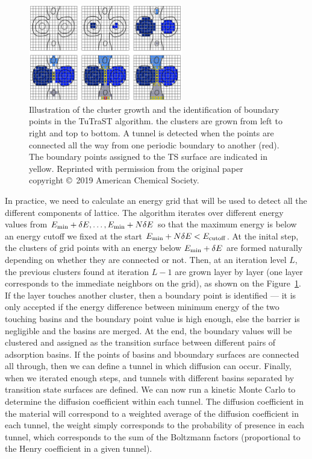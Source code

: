 \documentclass[main]{subfiles}
\begin{document}
\begin{figure}[ht]
  \centering
    \includegraphics[width=0.6\textwidth]{figures/5-diffusion/tutrast.jpg}
    \caption{ Illustration of the cluster growth and the identification of boundary points in the TuTraST algorithm\autocite{Mace_2019}. the clusters are grown from left to right and top to bottom. A tunnel is detected when the points are connected all the way from one periodic boundary to another (red). The boundary points assigned to the TS surface are indicated in yellow. Reprinted with permission from the original paper~\cite{Mace_2019} copyright \copyright\ 2019 American Chemical Society. }\label{fgr:tutrast}
\end{figure}

In practice, we need to calculate an energy grid that will be used to detect all the different components of lattice. The algorithm iterates over different energy values from $E_{\text{min}}+\delta E, \ldots, E_{\text{min}}+N\delta E$ so that the maximum energy is below an energy cutoff we fixed at the start $E_{\text{min}}+N\delta E<E_{\text{cutoff}}$. At the inital step, the clusters of grid points with an energy below $E_{\text{min}}+\delta E$ are formed naturally depending on whether they are connected or not. Then, at an iteration level $L$, the previous clusters found at iteration $L-1$ are grown layer by layer (one layer corresponds to the immediate neighbors on the grid), as shown on the Figure~\ref{fgr:tutrast}. If the layer touches another cluster, then a boundary point is identified --- it is only accepted if the energy difference between minimum energy of the two touching basins and the boundary point value is high enough, else the barrier is negligible and the basins are merged. At the end, the boundary values will be clustered and assigned as the transition surface between different pairs of adsorption basins. If the points of basins and bboundary surfaces are connected all through, then we can define a tunnel in which diffusion can occur. Finally, when we iterated enough steps, and tunnels with different basins separated by transition state surfaces are defined. We can now run a kinetic Monte Carlo to determine the diffusion coefficient within each tunnel. The diffusion coefficient in the material will correspond to a weighted average of the diffusion coefficient in each tunnel, the weight simply corresponds to the probability of presence in each tunnel, which corresponds to the sum of the Boltzmann factors (proportional to the Henry coefficient in a given tunnel). 
\end{document}
